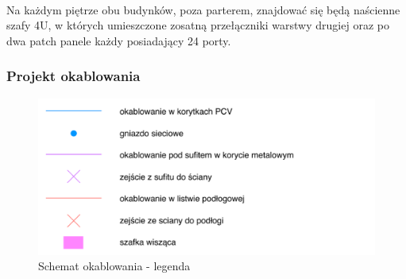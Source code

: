 \paragraph{}
Na każdym piętrze obu budynków, poza parterem, znajdować się będą naścienne szafy 4U, w których umieszczone zosatną przełączniki warstwy drugiej oraz po dwa patch panele każdy posiadający 24 porty.
\paragraph{}

\subsubsection{Projekt okablowania}
\begin{figure}[H]
  \begin{center}
    \includegraphics[width=\textwidth]{img/s/legenda.pdf}
    \caption{Schemat okablowania - legenda}
  \end{center}
\end{figure}


